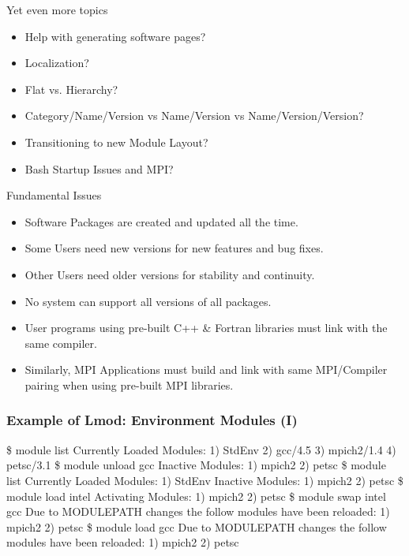 \documentclass{beamer}
\begin{document}
\begin{frame}{Yet even more topics}
  \begin{itemize}
    \item Help with generating software pages?
    \item Localization?
    \item Flat vs. Hierarchy?
    \item Category/Name/Version vs Name/Version vs
      Name/Version/Version?
    \item Transitioning to new Module Layout?
    \item Bash Startup Issues and MPI?
  \end{itemize}
\end{frame}


\begin{frame}{Fundamental Issues}
  \begin{itemize}
    \item Software Packages are created and updated all the time.
    \item Some Users need new versions for new features and bug fixes.
    \item Other Users need older versions for stability and continuity.
    \item No system can support all versions of all packages.
    \item User programs using pre-built C++ \& Fortran libraries must link with the same compiler.
    \item Similarly, MPI Applications must build and link with same
      MPI/Compiler pairing when using pre-built MPI libraries.
  \end{itemize}
\end{frame}


\begin{frame}[fragile]
    \frametitle{Example of Lmod: Environment Modules (I)}
    {\tiny
\begin{semiverbatim}
{\color{blue}\$ module list}
Currently Loaded Modules:
  1) StdEnv  2) gcc/4.5  3) mpich2/1.4  4) petsc/3.1
{\color{blue}\$ module unload gcc}
Inactive Modules:
  1) mpich2  2) petsc
{\color{blue}\$ module list}
Currently Loaded Modules:
  1) StdEnv
Inactive Modules:
  1) mpich2  2) petsc
{\color{blue}\$ module load intel}
Activating Modules:
  1) mpich2  2) petsc
{\color{blue}\$ module swap intel gcc}
Due to MODULEPATH changes the follow modules have been reloaded:
  1) mpich2  2) petsc
{\color{blue}\$ module load gcc}
Due to MODULEPATH changes the follow modules have been reloaded:
  1) mpich2  2) petsc
\end{semiverbatim}
    }
\end{frame}
\end{document}
